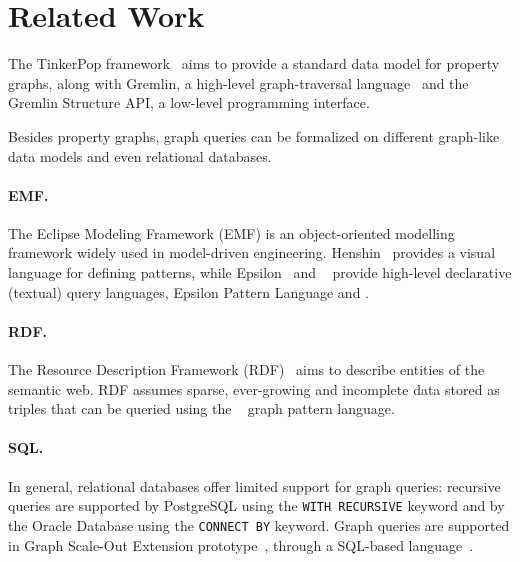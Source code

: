 \section{Related Work}
\label{sec:related-work}

The TinkerPop framework~\cite{TinkerPop} aims to provide a standard data model for property graphs, along with Gremlin, a high-level graph-traversal language~\cite{Rodriguez:2015:GGT:2815072.2815073} and the Gremlin Structure API, a low-level programming interface.

Besides property graphs, graph queries can be formalized on different graph-like data models and even relational databases.

\paragraph{EMF.} The Eclipse Modeling Framework (EMF) is an object-oriented modelling framework widely used in model-driven engineering. 
Henshin~\cite{DBLP:conf/models/ArendtBJKT10} provides a visual language for defining patterns, while Epsilon~\cite{DBLP:conf/icmt/KolovosPP08} and \viatraquery~\cite{DBLP:conf/models/BergmannHRVBBO10} provide high-level declarative (textual) query languages, Epsilon Pattern Language and \vql.

\paragraph{RDF.} The Resource Description Framework (RDF)~\cite{RDF} aims to describe entities of the semantic web. RDF assumes sparse, ever-growing and incomplete data stored as triples that can be queried using the \sparql~\cite{SPARQL} graph pattern language.

\lstset{language=}

\paragraph{SQL.} In general, relational databases offer limited support for graph queries: recursive queries are supported by \mbox{PostgreSQL} using the \lstinline+WITH RECURSIVE+ keyword and by the Oracle Database using the \lstinline+CONNECT BY+ keyword. Graph queries are supported in \saphana Graph
Scale-Out Extension prototype~\cite{DBLP:conf/btw/RudolfPBL13}, through a SQL-based language~\cite{DBLP:conf/gg/KrauseJDSKN16}.
